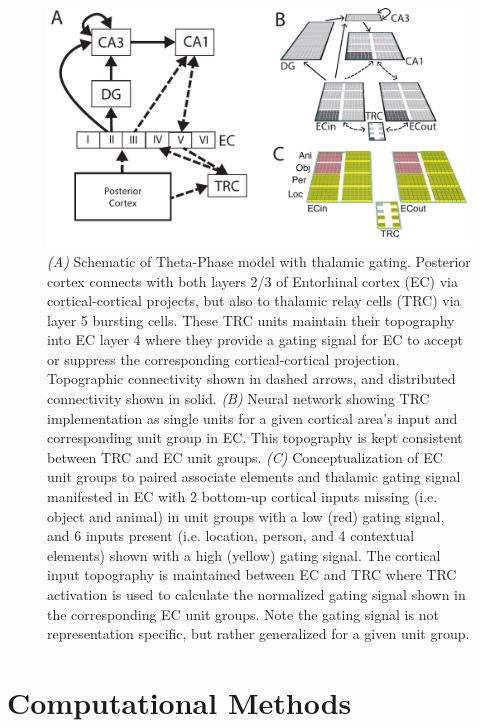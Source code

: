 \documentclass[11pt, titlepage, twoside]{article}
\begin{document}
\begin{figure}
	\includegraphics[width=\textwidth]{figs/depNet.pdf}
        \caption[Thalamic Gating as Implemented in Theta-Phase Model] {  \emph{(A)} Schematic of Theta-Phase model with thalamic gating.  Posterior cortex connects with both layers 2/3 of Entorhinal cortex (EC) via cortical-cortical projects, but also to thalamic relay cells (TRC) via layer 5 bursting cells.  These TRC units maintain their topography into EC layer 4 where they provide a gating signal for EC to accept or suppress the corresponding cortical-cortical projection. Topographic connectivity shown in dashed arrows, and distributed connectivity shown in solid.  \emph{(B)}  Neural network showing TRC implementation as single units for a given cortical area's input and corresponding unit group in EC.  This topography is kept consistent between TRC and EC unit groups.  \emph{(C)} Conceptualization of EC unit groups to paired associate elements and thalamic gating signal manifested in EC with 2 bottom-up cortical inputs missing (i.e. object and animal) in unit groups with a low (red) gating signal, and 6 inputs present (i.e. location, person, and 4 contextual elements) shown with a high (yellow) gating signal.  The cortical input topography is maintained between EC and TRC where TRC activation is used to calculate the normalized gating signal shown in the corresponding EC unit groups.  Note the gating signal is not representation specific, but rather generalized for a given unit group. 
        }
     \label{fig:depNet}
\end{figure}






\section{Computational Methods}\label{sec:compmethods}
\end{document}
